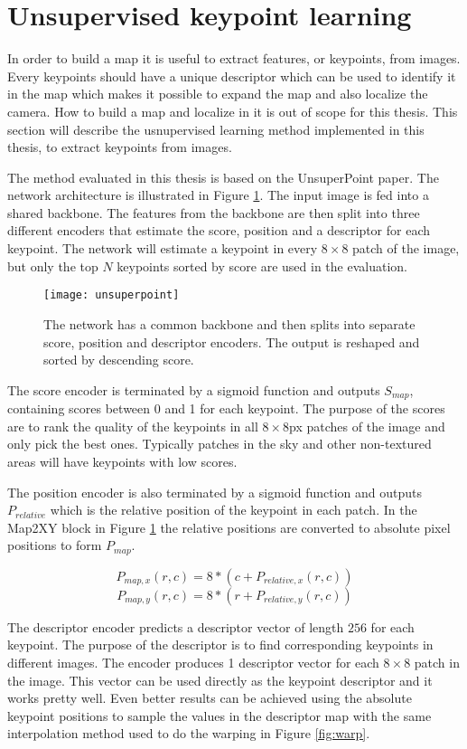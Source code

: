\newpage
\section{Unsupervised keypoint learning}

In order to build a map it is useful to extract features, or keypoints, from images. Every keypoints should have a unique descriptor which can be used to identify it in the map which makes it possible to expand the map and also localize the camera. How to build a map and localize in it is out of scope for this thesis. This section will describe the usnupervised learning method implemented in this thesis, to extract keypoints from images.

The method evaluated in this thesis is based on the UnsuperPoint paper\cite{unsuperpoint}. The network architecture is illustrated in Figure \ref{fig:unsuperpoint}. The input image is fed into a shared backbone. The features from the backbone are then split into three different encoders that estimate the score, position and a descriptor for each keypoint. The network will estimate a keypoint in every $8\times 8$ patch of the image, but only the top $N$ keypoints sorted by score are used in the evaluation.

\begin{figure}[H]
	\centering
	\texttt{[image: unsuperpoint]}
	\caption{The network has a common backbone and then splits into separate score, position and descriptor encoders. The output is reshaped and sorted by descending score.}
	\label{fig:unsuperpoint}
\end{figure}

The score encoder is terminated by a sigmoid function and outputs $S_{map}$, containing scores between 0 and 1 for each keypoint. The purpose of the scores are to rank the quality of the keypoints in all $8\times 8$px patches of the image and only pick the best ones. Typically patches in the sky and other non-textured areas will have keypoints with low scores.

The position encoder is also terminated by a sigmoid function and outputs $P_{relative}$ which is the relative position of the keypoint in each patch. In the Map2XY block in Figure \ref{fig:unsuperpoint} the relative positions are converted to absolute pixel positions to form $P_{map}$.

\[
P_{map,x}(r,c) = 8 * (c + P_{relative,x}(r,c))
\]
\[
P_{map,y}(r,c) = 8 * (r + P_{relative,y}(r,c))
\]

The descriptor encoder predicts a descriptor vector of length $256$ for each keypoint. The purpose of the descriptor is to find corresponding keypoints in different images. The encoder produces 1 descriptor vector for each $8\times 8$ patch in the image. This vector can be used directly as the keypoint descriptor and it works pretty well. Even better results can be achieved using the absolute keypoint positions to sample the values in the descriptor map with the same interpolation method used to do the warping in Figure \ref{fig:warp}.

